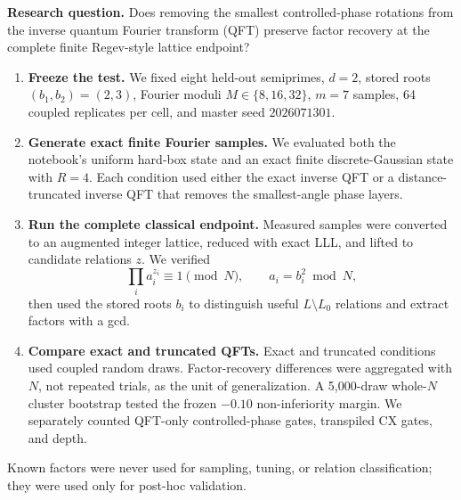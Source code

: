 

\begin{minipage}{\linewidth}
\color{MethodNavy}
\textbf{\large Research question.}
Does removing the smallest controlled-phase rotations from the inverse
quantum Fourier transform (QFT) preserve factor recovery at the complete
finite Regev-style lattice endpoint?

\vspace{0.45em}
\begin{enumerate}[leftmargin=1.45em,itemsep=0.45em,topsep=0.2em]
  \item[\textcolor{MethodBlue}{\textbf{1}}]
  \textbf{Freeze the test.}
  We fixed eight held-out semiprimes,
  \(d=2\), stored roots \((b_1,b_2)=(2,3)\),
  Fourier moduli \(M\in\{8,16,32\}\), \(m=7\) samples,
  64 coupled replicates per cell, and master seed \(2026071301\).

  \item[\textcolor{MethodPurple}{\textbf{2}}]
  \textbf{Generate exact finite Fourier samples.}
  We evaluated both the notebook's uniform hard-box state and an exact finite
  discrete-Gaussian state with \(R=4\).
  Each condition used either the exact inverse QFT or a distance-truncated
  inverse QFT that removes the smallest-angle phase layers.

  \item[\textcolor{MethodOrange}{\textbf{3}}]
  \textbf{Run the complete classical endpoint.}
  Measured samples were converted to an augmented integer lattice, reduced
  with exact LLL, and lifted to candidate relations \(z\).
  We verified
  \[
    \prod_i a_i^{z_i}\equiv 1\pmod N,
    \qquad a_i=b_i^2\bmod N,
  \]
  then used the stored roots \(b_i\) to distinguish useful
  \(L\setminus L_0\) relations and extract factors with a gcd.

  \item[\textcolor{MethodTeal}{\textbf{4}}]
  \textbf{Compare exact and truncated QFTs.}
  Exact and truncated conditions used coupled random draws.
  Factor-recovery differences were aggregated with \(N\), not repeated
  trials, as the unit of generalization.
  A 5,000-draw whole-\(N\) cluster bootstrap tested the frozen
  \(-0.10\) non-inferiority margin.
  We separately counted QFT-only controlled-phase gates, transpiled CX gates,
  and depth.
\end{enumerate}

\vspace{0.35em}
\colorbox{MethodNavy}{%
  \parbox{\dimexpr\linewidth-2\fboxsep\relax}{%
    \centering\color{white}\small
    Known factors were never used for sampling, tuning, or relation
    classification; they were used only for post-hoc validation.
  }%
}
\end{minipage}

